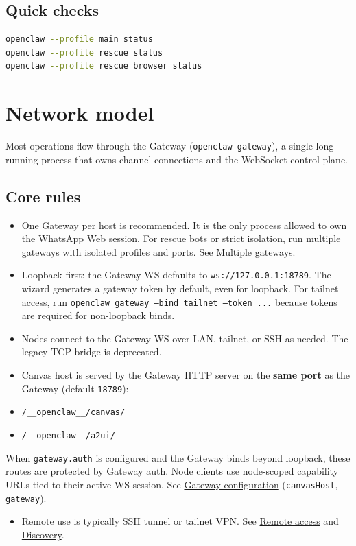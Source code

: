 \subsection{Quick checks}


\begin{lstlisting}[language=bash]
openclaw --profile main status
openclaw --profile rescue status
openclaw --profile rescue browser status
\end{lstlisting}



\clearpage

\section{Network model}

Most operations flow through the Gateway (\texttt{openclaw gateway}), a single long-running
process that owns channel connections and the WebSocket control plane.

\subsection{Core rules}


\begin{itemize}
  \item One Gateway per host is recommended. It is the only process allowed to own the WhatsApp Web session. For rescue bots or strict isolation, run multiple gateways with isolated profiles and ports. See \href{/gateway/multiple-gateways}{Multiple gateways}.
  \item Loopback first: the Gateway WS defaults to \texttt{ws://127.0.0.1:18789}. The wizard generates a gateway token by default, even for loopback. For tailnet access, run \texttt{openclaw gateway --bind tailnet --token ...} because tokens are required for non-loopback binds.
  \item Nodes connect to the Gateway WS over LAN, tailnet, or SSH as needed. The legacy TCP bridge is deprecated.
  \item Canvas host is served by the Gateway HTTP server on the \textbf{same port} as the Gateway (default \texttt{18789}):
  \item \texttt{/\_\_openclaw\_\_/canvas/}
  \item \texttt{/\_\_openclaw\_\_/a2ui/}
\end{itemize}

When \texttt{gateway.auth} is configured and the Gateway binds beyond loopback, these routes are protected by Gateway auth. Node clients use node-scoped capability URLs tied to their active WS session. See \href{/gateway/configuration}{Gateway configuration} (\texttt{canvasHost}, \texttt{gateway}).
\begin{itemize}
  \item Remote use is typically SSH tunnel or tailnet VPN. See \href{/gateway/remote}{Remote access} and \href{/gateway/discovery}{Discovery}.
\end{itemize}



